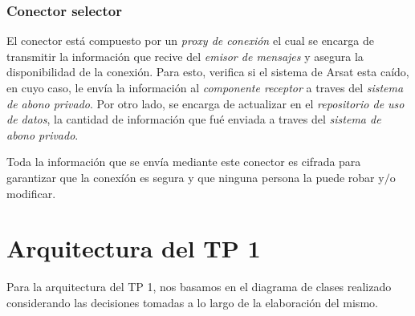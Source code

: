 \documentclass[a4paper, 10pt, twoside]{article}
\begin{document}
\subsubsection{Conector selector}

El conector está compuesto por un \textit{proxy de conexión} el cual se encarga de transmitir la información que recive del \textit{emisor de mensajes} y asegura la disponibilidad de la conexión. Para esto, verifica si el sistema de Arsat esta caído, en cuyo caso, le envía la información al \textit{componente receptor} a traves del \textit{sistema de abono privado}. Por otro lado, se encarga de actualizar en el \textit{repositorio de uso de datos}, la cantidad de información que fué enviada a traves del \textit{sistema de abono privado}. 

Toda la información que se envía mediante este conector es cifrada para garantizar que la conexíón es segura y que ninguna persona la puede robar y$/$o modificar.

\newpage




\section{Arquitectura del TP 1}

Para la arquitectura del TP 1, nos basamos en el diagrama de clases realizado considerando las decisiones tomadas a lo largo de la elaboración del mismo.
\end{document}
